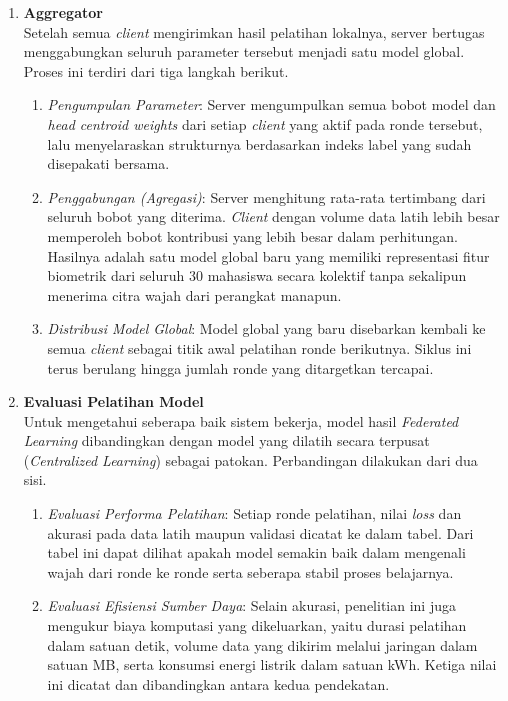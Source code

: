 \begin{enumerate}
  \item \textbf{Aggregator} \\
  Setelah semua \textit{client} mengirimkan hasil pelatihan lokalnya, server bertugas menggabungkan seluruh parameter tersebut menjadi satu model global. Proses ini terdiri dari tiga langkah berikut.
  \begin{enumerate}
    \item \textit{Pengumpulan Parameter}: Server mengumpulkan semua bobot model dan \textit{head centroid weights} dari setiap \textit{client} yang aktif pada ronde tersebut, lalu menyelaraskan strukturnya berdasarkan indeks label yang sudah disepakati bersama.
    \item \textit{Penggabungan (Agregasi)}: Server menghitung rata-rata tertimbang dari seluruh bobot yang diterima. \textit{Client} dengan volume data latih lebih besar memperoleh bobot kontribusi yang lebih besar dalam perhitungan. Hasilnya adalah satu model global baru yang memiliki representasi fitur biometrik dari seluruh 30 mahasiswa secara kolektif tanpa sekalipun menerima citra wajah dari perangkat manapun.
    \item \textit{Distribusi Model Global}: Model global yang baru disebarkan kembali ke semua \textit{client} sebagai titik awal pelatihan ronde berikutnya. Siklus ini terus berulang hingga jumlah ronde yang ditargetkan tercapai.
  \end{enumerate}

  \item \textbf{Evaluasi Pelatihan Model} \\
  Untuk mengetahui seberapa baik sistem bekerja, model hasil \textit{Federated Learning} dibandingkan dengan model yang dilatih secara terpusat (\textit{Centralized Learning}) sebagai patokan. Perbandingan dilakukan dari dua sisi.
  \begin{enumerate}
    \item \textit{Evaluasi Performa Pelatihan}: Setiap ronde pelatihan, nilai \textit{loss} dan akurasi pada data latih maupun validasi dicatat ke dalam tabel. Dari tabel ini dapat dilihat apakah model semakin baik dalam mengenali wajah dari ronde ke ronde serta seberapa stabil proses belajarnya.
    \item \textit{Evaluasi Efisiensi Sumber Daya}: Selain akurasi, penelitian ini juga mengukur biaya komputasi yang dikeluarkan, yaitu durasi pelatihan dalam satuan detik, volume data yang dikirim melalui jaringan dalam satuan MB, serta konsumsi energi listrik dalam satuan kWh. Ketiga nilai ini dicatat dan dibandingkan antara kedua pendekatan.
  \end{enumerate}
\end{enumerate}

